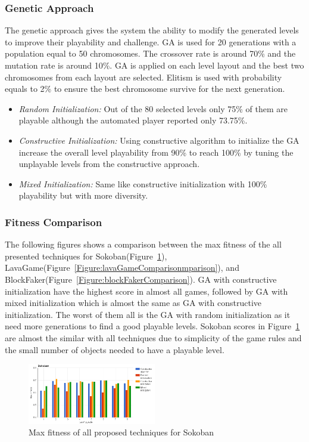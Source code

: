 \documentclass[letterpaper]{article}
\newcommand{\figref}[1]{Figure~\ref{Figure:#1}}
\begin{document}
\subsubsection{Genetic Approach}
The genetic approach gives the system the ability to modify the generated levels to improve their playability and challenge. GA is used for 20 generations with a population equal to 50 chromosomes. The crossover rate is around 70\% and the mutation rate is around 10\%. GA is applied on each level layout and the best two chromosomes from each layout are selected. Elitism is used with probability equals to 2\% to ensure the best chromosome survive for the next generation.
\begin{itemize}
	\item \emph{Random Initialization:} Out of the 80 selected levels only 75\% of them are playable although the automated player reported only 73.75\%.
	\item \emph{Constructive Initialization:} Using constructive algorithm to initialize the GA increase the overall level playability from 90\% to reach 100\% by tuning the unplayable levels from the constructive approach.
	\item \emph{Mixed Initialization:} Same like constructive initialization with 100\% playability but with more diversity.
\end{itemize}

\subsubsection{Fitness Comparison}
The following figures shows a comparison between the max fitness of the all presented techniques for Sokoban(\figref{sokobanComparison}), LavaGame(\figref{lavaGameComparisonmparison}), and BlockFaker(\figref{blockFakerComparison}). GA with constructive initialization have the highest score in almost all games, followed by GA with mixed initialization which is almost the same as GA with constructive initialization. The worst of them all is the GA with random initialization as it need more generations to find a good playable levels. Sokoban scores in \figref{sokobanComparison} are almost the similar with all techniques due to simplicity of the game rules and the small number of objects needed to have a playable level.

\begin{figure}
  	\centering
    \includegraphics[width=0.5\textwidth]{Images/sokobanComparison}
    \caption{Max fitness of all proposed techniques for Sokoban}
    \label{Figure:sokobanComparison}
\end{figure}
\end{document}
